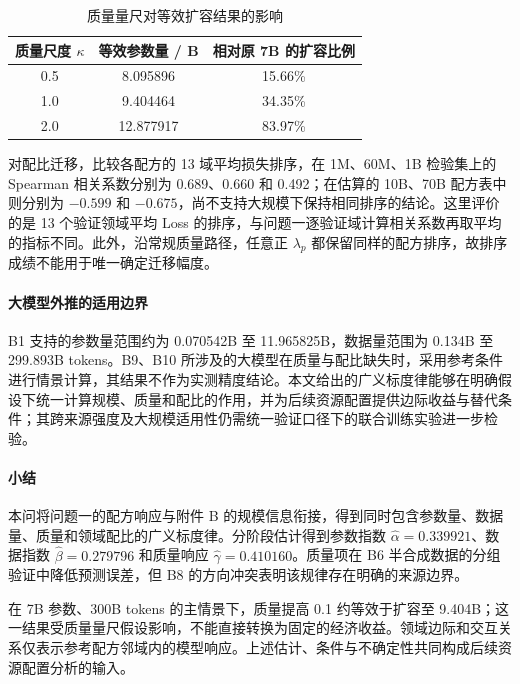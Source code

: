 \documentclass[bwprint]{gmcmthesis}
\numberwithin{equation}{section}
\numberwithin{figure}{section}
\numberwithin{table}{section}
\begin{document}
        \begin{table}[H]
         \centering
         \caption{质量量尺对等效扩容结果的影响}
         \label{tab:p2_sensitivity}
         \begin{tabular}{ccc}
          \toprule
          质量尺度 $\kappa$ & 等效参数量 / B & 相对原 7B 的扩容比例 \\
          \midrule
          0.5 & 8.095896 & 15.66\% \\
          1.0 & 9.404464 & 34.35\% \\
          2.0 & 12.877917 & 83.97\% \\
          \bottomrule
         \end{tabular}
        \end{table}
        
        对配比迁移，比较各配方的 13 域平均损失排序，在 1M、60M、1B 检验集上的 Spearman 相关系数分别为 0.689、0.660 和 0.492；在估算的 10B、70B 配方表中则分别为 $-0.599$ 和 $-0.675$，尚不支持大规模下保持相同排序的结论。这里评价的是 13 个验证领域平均 Loss 的排序，与问题一逐验证域计算相关系数再取平均的指标不同。此外，沿常规质量路径，任意正 $\lambda_p$ 都保留同样的配方排序，故排序成绩不能用于唯一确定迁移幅度。

        \paragraph{大模型外推的适用边界}
        B1 支持的参数量范围约为 0.070542B 至 11.965825B，数据量范围为 0.134B 至 299.893B tokens。B9、B10 所涉及的大模型在质量与配比缺失时，采用参考条件进行情景计算，其结果不作为实测精度结论。本文给出的广义标度律能够在明确假设下统一计算规模、质量和配比的作用，并为后续资源配置提供边际收益与替代条件；其跨来源强度及大规模适用性仍需统一验证口径下的联合训练实验进一步检验。

        \paragraph{小结}
        本问将问题一的配方响应与附件 B 的规模信息衔接，得到同时包含参数量、数据量、质量和领域配比的广义标度律。分阶段估计得到参数指数 $\widehat\alpha=0.339921$、数据指数 $\widehat\beta=0.279796$ 和质量响应 $\widehat\gamma=0.410160$。质量项在 B6 半合成数据的分组验证中降低预测误差，但 B8 的方向冲突表明该规律存在明确的来源边界。

        在 7B 参数、300B tokens 的主情景下，质量提高 0.1 约等效于扩容至 9.404B；这一结果受质量量尺假设影响，不能直接转换为固定的经济收益。领域边际和交互关系仅表示参考配方邻域内的模型响应。上述估计、条件与不确定性共同构成后续资源配置分析的输入。
        
\end{document}
